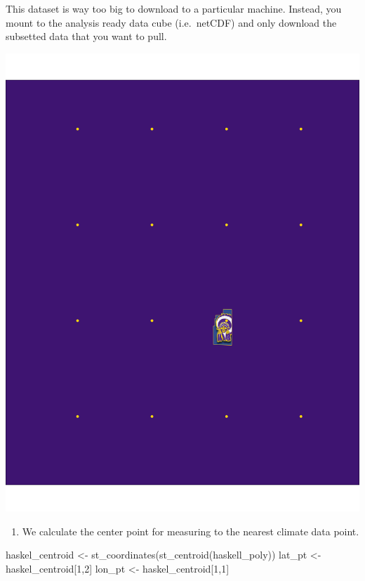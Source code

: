 \documentclass[
  paper=a4,
  ,captions=tableheading
]{scrartcl}
\newenvironment{Shaded}{\begin{snugshade}}{\end{snugshade}}
\newcommand{\DecValTok}[1]{\textcolor[rgb]{0.00,0.00,0.81}{#1}}
\newcommand{\FunctionTok}[1]{\textcolor[rgb]{0.00,0.00,0.00}{#1}}
\newcommand{\NormalTok}[1]{#1}
\newcommand{\OtherTok}[1]{\textcolor[rgb]{0.56,0.35,0.01}{#1}}
\providecommand{\tightlist}{%
  \setlength{\itemsep}{0pt}\setlength{\parskip}{0pt}}
\begin{document}
This dataset is way too big to download to a particular machine.
Instead, you mount to the analysis ready data cube (i.e.~netCDF) and
only download the subsetted data that you want to pull.

\includegraphics{climate_grid.png}

\begin{enumerate}
\def\labelenumi{\arabic{enumi}.}
\tightlist
\item
  We calculate the center point for measuring to the nearest climate
  data point.
\end{enumerate}

\begin{Shaded}
\begin{Highlighting}[]
\NormalTok{haskel\_centroid }\OtherTok{\textless{}{-}} \FunctionTok{st\_coordinates}\NormalTok{(}\FunctionTok{st\_centroid}\NormalTok{(haskell\_poly))}
\NormalTok{lat\_pt }\OtherTok{\textless{}{-}}\NormalTok{ haskel\_centroid[}\DecValTok{1}\NormalTok{,}\DecValTok{2}\NormalTok{]}
\NormalTok{lon\_pt }\OtherTok{\textless{}{-}}\NormalTok{ haskel\_centroid[}\DecValTok{1}\NormalTok{,}\DecValTok{1}\NormalTok{]}
\end{Highlighting}
\end{Shaded}
\end{document}
